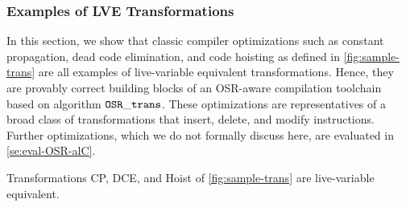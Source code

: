 
\subsubsection{Examples of LVE Transformations}

\label{ss:lve-trans}

In this section, we show that classic compiler optimizations such as constant propagation, dead code elimination, and code hoisting as defined in \myfigure\ref{fig:sample-trans} are all examples of live-variable equivalent transformations. Hence, they are provably correct building blocks of an OSR-aware compilation toolchain based on algorithm $\text{${\tt OSR\_trans}$}$. These optimizations are representatives of a broad class of transformations that insert, delete, and modify instructions. Further optimizations, which we do not formally discuss here, are evaluated in \mysection\ref{se:eval-OSR-alC}.

\begin{theorem}
\label{th:lve-trans-examples}
Transformations CP, DCE, and Hoist of \myfigure\ref{fig:sample-trans} are live-variable equivalent.
\end{theorem}

